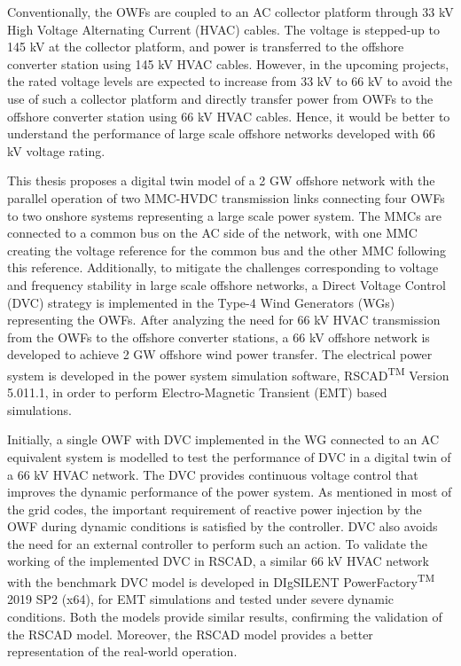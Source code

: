 Conventionally, the OWFs are coupled to an AC collector platform through 33 kV High Voltage Alternating Current (HVAC) cables. The voltage is stepped-up to 145 kV at the collector platform, and power is transferred to the offshore converter station using 145 kV HVAC cables. However, in the upcoming projects, the rated voltage levels are expected to increase from 33 kV to 66 kV to avoid the use of such a collector platform and directly transfer power from OWFs to the offshore converter station using 66 kV HVAC cables. Hence, it would be better to understand the performance of large scale offshore networks developed with 66 kV voltage rating.   

This thesis proposes a digital twin model of a 2 GW offshore network with the parallel operation of two MMC-HVDC transmission links connecting four OWFs to two onshore systems representing a large scale power system. The MMCs are connected to a common bus on the AC side of the network, with one MMC creating the voltage reference for the common bus and the other MMC following this reference. Additionally, to mitigate the challenges corresponding to voltage and frequency stability in large scale offshore networks, a Direct Voltage Control (DVC) strategy is implemented in the Type-4 Wind Generators (WGs) representing the OWFs. After analyzing the need for 66 kV HVAC transmission from the OWFs to the offshore converter stations, a 66 kV offshore network is developed to achieve 2 GW offshore wind power transfer. The electrical power system is developed in the power system simulation software, RSCAD\textsuperscript{TM} Version 5.011.1, in order to perform Electro-Magnetic Transient (EMT) based simulations. 

Initially, a single OWF with DVC implemented in the WG connected to an AC equivalent system is modelled to test the performance of DVC in a digital twin of a 66 kV HVAC network. The DVC provides continuous voltage control that improves the dynamic performance of the power system. As mentioned in most of the grid codes, the important requirement of reactive power injection by the OWF during dynamic conditions is satisfied by the controller. DVC also avoids the need for an external controller to perform such an action. To validate the working of the implemented DVC in RSCAD, a similar 66 kV HVAC network with the benchmark DVC model is developed in DIgSILENT PowerFactory\textsuperscript{TM} 2019 SP2 (x64), for EMT simulations and tested under severe dynamic conditions. Both the models provide similar results, confirming the validation of the RSCAD model. Moreover, the RSCAD model provides a better representation of the real-world operation. 

